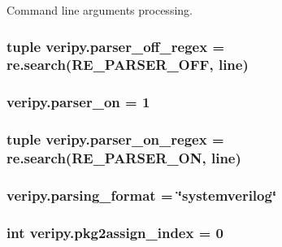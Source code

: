 Command line arguments processing. 

\hypertarget{namespaceveripy_afcccb50dd7b0fb2b644b9c1d2323a3c1}{
\subsubsection[{parser\-\_\-off\-\_\-regex}]{\setlength{\rightskip}{0pt plus 5cm}tuple veripy.\-parser\-\_\-off\-\_\-regex = re.\-search(R\-E\-\_\-\-P\-A\-R\-S\-E\-R\-\_\-\-O\-F\-F, {\bf line})}}\label{namespaceveripy_afcccb50dd7b0fb2b644b9c1d2323a3c1}
\hypertarget{namespaceveripy_ae24d8c06b7040a72197b627d31e98657}{
\subsubsection[{parser\-\_\-on}]{\setlength{\rightskip}{0pt plus 5cm}veripy.\-parser\-\_\-on = 1}}\label{namespaceveripy_ae24d8c06b7040a72197b627d31e98657}
\hypertarget{namespaceveripy_acaab00af25a2a159e2accd5ec9f5ddf2}{
\subsubsection[{parser\-\_\-on\-\_\-regex}]{\setlength{\rightskip}{0pt plus 5cm}tuple veripy.\-parser\-\_\-on\-\_\-regex = re.\-search(R\-E\-\_\-\-P\-A\-R\-S\-E\-R\-\_\-\-O\-N, {\bf line})}}\label{namespaceveripy_acaab00af25a2a159e2accd5ec9f5ddf2}
\hypertarget{namespaceveripy_a2741464a2b91f4bed59350a121937e21}{
\subsubsection[{parsing\-\_\-format}]{\setlength{\rightskip}{0pt plus 5cm}veripy.\-parsing\-\_\-format = \char`\"{}systemverilog\char`\"{}}}\label{namespaceveripy_a2741464a2b91f4bed59350a121937e21}
\hypertarget{namespaceveripy_ad519db7b0f685cc6c804c7ecc3bc02b5}{
\subsubsection[{pkg2assign\-\_\-index}]{\setlength{\rightskip}{0pt plus 5cm}int veripy.\-pkg2assign\-\_\-index = 0}}\label{namespaceveripy_ad519db7b0f685cc6c804c7ecc3bc02b5}
